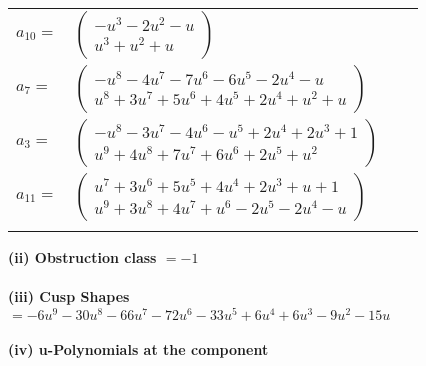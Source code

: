 \documentclass[1p]{elsarticle_modified}
\theoremstyle{definition}
\begin{document}
\begin{tabular}{m{7pt} m{180pt} m{7pt} m{180pt} }
\flushright $a_{10}=$&$\begin{pmatrix}- u^3-2 u^2- u\\u^3+u^2+u\end{pmatrix}$ \\
\flushright $a_{7}=$&$\begin{pmatrix}- u^8-4 u^7-7 u^6-6 u^5-2 u^4- u\\u^8+3 u^7+5 u^6+4 u^5+2 u^4+u^2+u\end{pmatrix}$ \\
\flushright $a_{3}=$&$\begin{pmatrix}- u^8-3 u^7-4 u^6- u^5+2 u^4+2 u^3+1\\u^9+4 u^8+7 u^7+6 u^6+2 u^5+u^2\end{pmatrix}$ \\
\flushright $a_{11}=$&$\begin{pmatrix}u^7+3 u^6+5 u^5+4 u^4+2 u^3+u+1\\u^9+3 u^8+4 u^7+u^6-2 u^5-2 u^4- u\end{pmatrix}$\\&\end{tabular}
\flushleft \textbf{(ii) Obstruction class $= -1$}\\~\\
\flushleft \textbf{(iii) Cusp Shapes $= -6 u^9-30 u^8-66 u^7-72 u^6-33 u^5+6 u^4+6 u^3-9 u^2-15 u$}\\~\\
\newpage\renewcommand{\arraystretch}{1}
\flushleft \textbf{(iv) u-Polynomials at the component}\newline \\
\end{document}
